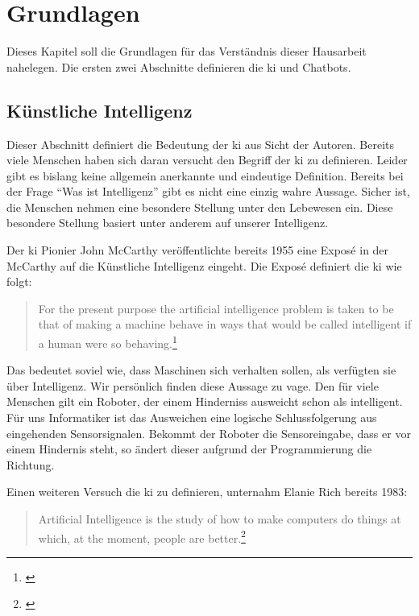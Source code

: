 \section{Grundlagen}
Dieses Kapitel soll die Grundlagen für das Verständnis dieser Hausarbeit nahelegen. Die ersten zwei Abschnitte definieren die \ac{ki} und Chatbots. 

\subsection{Künstliche Intelligenz}
Dieser Abschnitt definiert die Bedeutung der \ac{ki} aus Sicht der Autoren. Bereits viele Menschen haben sich daran versucht den Begriff der \ac{ki} zu definieren. Leider gibt es bislang keine allgemein anerkannte und eindeutige Definition. Bereits bei der Frage \enquote{Was ist Intelligenz} gibt es nicht eine einzig wahre Aussage. Sicher ist, die Menschen nehmen eine besondere Stellung unter den Lebewesen ein. Diese besondere Stellung basiert unter anderem auf unserer Intelligenz. 

Der \ac{ki} Pionier John McCarthy veröffentlichte bereits 1955 eine Exposé in der McCarthy auf die Künstliche Intelligenz eingeht. Die Exposé definiert die \ac{ki} wie folgt:
\begin{quote}
		\glqq For the present purpose the artificial intelligence problem is taken to be that of making a machine behave in ways that would be called intelligent if a human were so behaving.\grqq\footnote{\cite{PROPOSALMcCarthy}}
\end{quote}
Das bedeutet soviel wie, dass Maschinen sich verhalten sollen, als verfügten sie über Intelligenz. Wir persönlich finden diese Aussage zu vage. Den für viele Menschen gilt ein Roboter, der einem Hinderniss ausweicht schon als intelligent. Für uns Informatiker ist das Ausweichen eine logische Schlussfolgerung aus eingehenden Sensorsignalen. Bekommt der Roboter die Sensoreingabe, dass er vor einem Hindernis steht, so ändert dieser aufgrund der Programmierung die Richtung.

Einen weiteren Versuch die \ac{ki} zu definieren, unternahm Elanie Rich bereits 1983: 
\begin{quote}
	 \glqq Artificial Intelligence is the study of how to make computers do things at which, at the moment, people are better.\grqq\footnote{\cite{ArtificialIntelligence}}
\end{quote}

